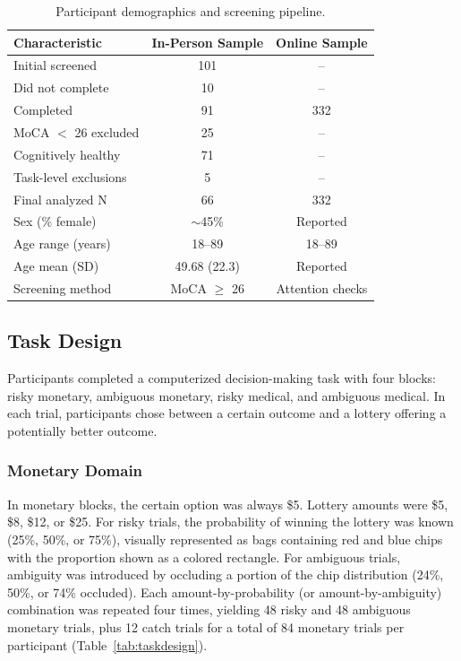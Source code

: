 \documentclass[12pt]{article}
\begin{document}
\begin{table}[ht]
\centering
\caption{Participant demographics and screening pipeline.}
\label{tab:demographics}
\begin{tabular}{lcc}
\toprule
Characteristic & In-Person Sample & Online Sample \\
\midrule
Initial screened & 101 & -- \\
Did not complete & 10 & -- \\
Completed & 91 & 332 \\
MoCA $<$ 26 excluded & 25 & -- \\
Cognitively healthy & 71 & -- \\
Task-level exclusions & 5 & -- \\
Final analyzed N & 66 & 332 \\
Sex (\% female) & $\sim$45\% & Reported \\
Age range (years) & 18--89 & 18--89 \\
Age mean (SD) & 49.68 (22.3) & Reported \\
Screening method & MoCA $\geq$ 26 & Attention checks \\
\bottomrule
\end{tabular}
\end{table}

\subsection{Task Design}

Participants completed a computerized decision-making task with four blocks: risky monetary, ambiguous monetary, risky medical, and ambiguous medical. In each trial, participants chose between a certain outcome and a lottery offering a potentially better outcome.

\subsubsection{Monetary Domain}

In monetary blocks, the certain option was always \$5. Lottery amounts were \$5, \$8, \$12, or \$25. For risky trials, the probability of winning the lottery was known (25\%, 50\%, or 75\%), visually represented as bags containing red and blue chips with the proportion shown as a colored rectangle. For ambiguous trials, ambiguity was introduced by occluding a portion of the chip distribution (24\%, 50\%, or 74\% occluded). Each amount-by-probability (or amount-by-ambiguity) combination was repeated four times, yielding 48 risky and 48 ambiguous monetary trials, plus 12 catch trials for a total of 84 monetary trials per participant (Table~\ref{tab:taskdesign}).
\end{document}

